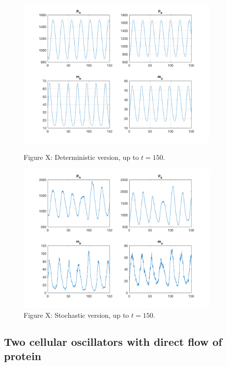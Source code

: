 \documentclass[12pt]{article}
\renewcommand{\(}{\left (}
\renewcommand{\)}{\right )}
\begin{document}
\begin{figure} [h]
    \centering
	\begin{minipage}{0.45\textwidth}
		\centering
		\includegraphics[width=0.89\textwidth]{single_oscillator_zoom_out.png}
		\caption*{\small Figure X: Deterministic version, up to $t=150.$}
	\end{minipage}
	\begin{minipage}{0.45\textwidth}
		\centering
		\includegraphics[width=0.89\textwidth]{sto_single_oscillator_zoom_out.png}
		\caption*{\small Figure X: Stochastic version, up to $t=150.$}
	\end{minipage}
\end{figure}

\subsection{Two cellular oscillators with direct flow of protein}
\end{document}
